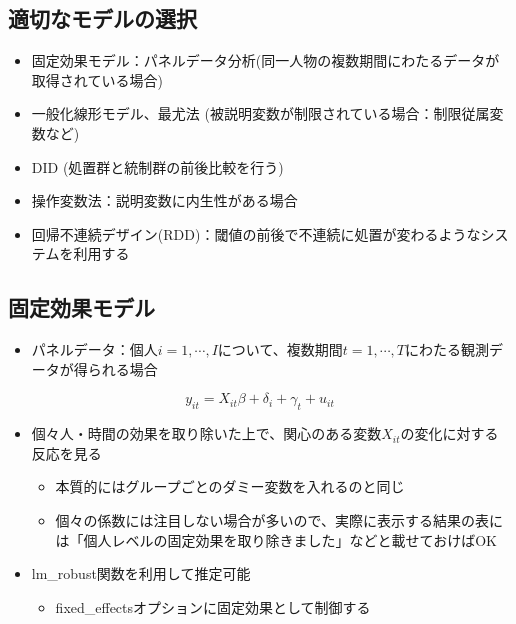 \documentclass[
]{ltjsarticle}
\providecommand{\tightlist}{%
  \setlength{\itemsep}{0pt}\setlength{\parskip}{0pt}}
\begin{document}
\hypertarget{ux9069ux5207ux306aux30e2ux30c7ux30ebux306eux9078ux629e}{%
\subsection{適切なモデルの選択}\label{ux9069ux5207ux306aux30e2ux30c7ux30ebux306eux9078ux629e}}

\begin{itemize}
\tightlist
\item
  固定効果モデル：パネルデータ分析(同一人物の複数期間にわたるデータが取得されている場合)
\item
  一般化線形モデル、最尤法
  (被説明変数が制限されている場合：制限従属変数など)
\item
  DID (処置群と統制群の前後比較を行う)
\item
  操作変数法：説明変数に内生性がある場合
\item
  回帰不連続デザイン(RDD)：閾値の前後で不連続に処置が変わるようなシステムを利用する
\end{itemize}

\hypertarget{ux56faux5b9aux52b9ux679cux30e2ux30c7ux30eb}{%
\subsection{固定効果モデル}\label{ux56faux5b9aux52b9ux679cux30e2ux30c7ux30eb}}

\begin{itemize}
\tightlist
\item
  パネルデータ：個人\(i = 1, \cdots, I\)について、複数期間\(t = 1, \cdots, T\)にわたる観測データが得られる場合
\end{itemize}

\[y_{it} = X_{it} \beta + \delta_i + \gamma_t + u_{it}\]

\begin{itemize}
\tightlist
\item
  個々人・時間の効果を取り除いた上で、関心のある変数\(X_{it}\)の変化に対する反応を見る

  \begin{itemize}
  \tightlist
  \item
    本質的にはグループごとのダミー変数を入れるのと同じ
  \item
    個々の係数には注目しない場合が多いので、実際に表示する結果の表には「個人レベルの固定効果を取り除きました」などと載せておけばOK
  \end{itemize}
\item
  lm\_robust関数を利用して推定可能

  \begin{itemize}
  \tightlist
  \item
    fixed\_effectsオプションに固定効果として制御する
  \end{itemize}
\end{itemize}
\end{document}
